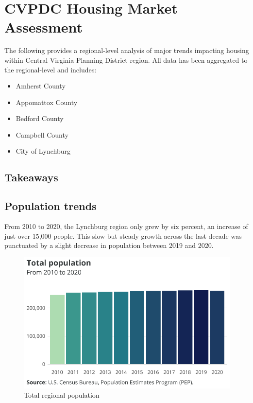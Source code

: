 \documentclass[
  letterpaper,
  DIV=11,
  numbers=noendperiod]{scrreprt}
\providecommand{\tightlist}{%
  \setlength{\itemsep}{0pt}\setlength{\parskip}{0pt}}\usepackage{longtable,booktabs,array}
\begin{document}
\hypertarget{part-3-1}{%
\chapter{CVPDC Housing Market Assessment}\label{part-3-1}}

The following provides a regional-level analysis of major trends
impacting housing within Central Virginia Planning District region. All
data has been aggregated to the regional-level and includes:

\begin{itemize}
\tightlist
\item
  Amherst County
\item
  Appomattox County
\item
  Bedford County
\item
  Campbell County
\item
  City of Lynchburg
\end{itemize}

\hypertarget{takeaways}{%
\section{Takeaways}\label{takeaways}}

\hypertarget{population-trends}{%
\section{Population trends}\label{population-trends}}

From 2010 to 2020, the Lynchburg region only grew by six percent, an
increase of just over 15,000 people. This slow but steady growth across
the last decade was punctuated by a slight decrease in population
between 2019 and 2020.

\begin{figure}[H]

{\centering \includegraphics{./part-3-1_files/figure-pdf/fig-pop-1.pdf}

}

\caption{\label{fig-pop}Total regional population}

\end{figure}
\end{document}

